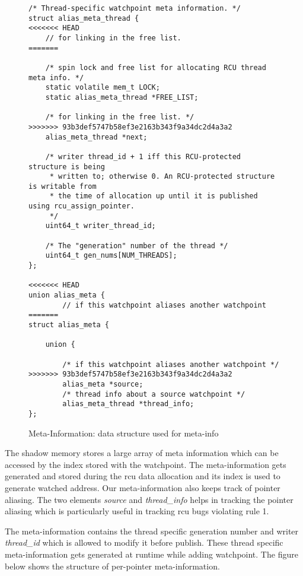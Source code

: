 \begin{figure*}[h]
\centering
\begin{lstlisting}
/* Thread-specific watchpoint meta information. */
struct alias_meta_thread {
<<<<<<< HEAD
    // for linking in the free list.
=======

    /* spin lock and free list for allocating RCU thread meta info. */
    static volatile mem_t LOCK;
    static alias_meta_thread *FREE_LIST;

    /* for linking in the free list. */
>>>>>>> 93b3def5747b58ef3e2163b343f9a34dc2d4a3a2
    alias_meta_thread *next;

    /* writer thread_id + 1 iff this RCU-protected structure is being
     * written to; otherwise 0. An RCU-protected structure is writable from
     * the time of allocation up until it is published using rcu_assign_pointer.
     */
    uint64_t writer_thread_id;

    /* The "generation" number of the thread */
    uint64_t gen_nums[NUM_THREADS];
};

<<<<<<< HEAD
union alias_meta {
        // if this watchpoint aliases another watchpoint
=======
struct alias_meta {

    union {

        /* if this watchpoint aliases another watchpoint */
>>>>>>> 93b3def5747b58ef3e2163b343f9a34dc2d4a3a2
        alias_meta *source;
        /* thread info about a source watchpoint */
        alias_meta_thread *thread_info;
}; 
\end{lstlisting}
\caption{Meta-Information: data structure used for meta-info}\label{fig:metainfo}
\end{figure*}



The shadow memory stores a large array of meta information which can be accessed by the index stored with the watchpoint. The meta-information gets generated and stored during the rcu data allocation and its index is used to generate watched address. Our meta-information also keeps track of pointer aliasing. The two elements \emph{source} and \emph{thread\_info} helps in tracking the pointer aliasing which is particularly useful in tracking rcu bugs violating rule 1.

The meta-information contains the thread specific generation number and writer \emph{thread\_id} which is allowed to modify it before publish. These thread specific meta-information gets generated at runtime while adding watchpoint. The figure below shows the structure of per-pointer meta-information.

